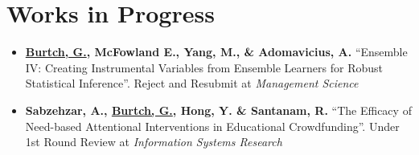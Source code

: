 \documentclass[10.5pt,letterpaper,sans]{moderncv}        %
\begin{document}
\section{Works in Progress}

\begin{itemize}[leftmargin=!,labelindent=5pt,itemindent=-15pt]




\item \textbf{\underline{Burtch, G.}, McFowland E., Yang, M., \& Adomavicius, A.} ``Ensemble IV: Creating Instrumental Variables from Ensemble Learners for Robust Statistical Inference''. Reject and Resubmit at \textit{Management Science}

\item \textbf{Sabzehzar, A., \underline{Burtch, G.}, Hong, Y. \& Santanam, R.} ``The Efficacy of Need-based Attentional Interventions in Educational Crowdfunding''. Under 1st Round Review at \textit{Information Systems Research}




\end{itemize}
\end{document}
